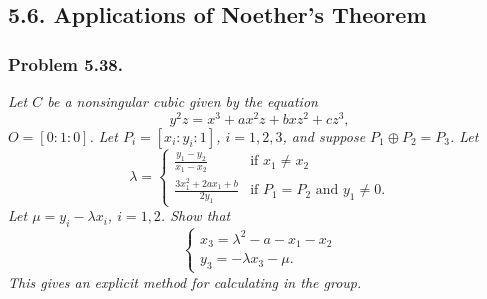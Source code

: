 \documentclass{article}
\begin{document}



\subsection*{5.6. Applications of Noether's Theorem \\}



\subsubsection*{Problem 5.38.}
\emph{Let $C$ be a nonsingular cubic given by the equation
\[
  y^2z = x^3 + ax^2z + bxz^2 + cz^3,
\]
$O = [0:1:0]$.
Let $P_i = [x_i:y_i:1]$, $i = 1, 2, 3$,
and suppose $P_1 \oplus P_2 = P_3$.
Let
\begin{equation*}
  \lambda = 
  \begin{cases}
    \frac{y_1-y_2}{x_1-x_2} & \text{if $x_1 \neq x_2$} \\
    \frac{3x_1^2+2ax_1+b}{2y_1} & \text{if $P_1 = P_2$ and $y_1 \neq 0$}.
  \end{cases}
\end{equation*}
Let $\mu = y_i-\lambda x_i$, $i = 1, 2$.
Show that
\begin{equation*}
  \begin{cases}
    x_3 = \lambda^2-a-x_1-x_2 \\
    y_3 = -\lambda x_3-\mu.
  \end{cases}
\end{equation*}
This gives an explicit method for calculating in the group.} \\
\end{document}
